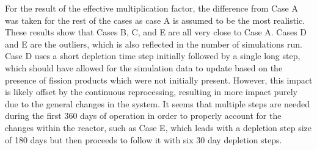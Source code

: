 

For the result of the effective multiplication factor, the difference from Case A was taken for the rest of the cases as case A is assumed to be the most realistic.
These results show that Cases B, C, and E are all very close to Case A. Cases D and E are the outliers, which is also reflected in the number of simulations run. Case D uses a short depletion time step initially followed by a single long step, which should have allowed for the simulation data to update based on the presence of fission products which were not initially present.
However, this impact is likely offset by the continuous reprocessing, resulting in more impact purely due to the general changes in the system. It seems that multiple steps are needed during the first 360 days of operation in order to properly account for the changes within the reactor, such as Case E, which leads with a depletion step size of 180 days but then proceeds to follow it with six 30 day depletion steps.

